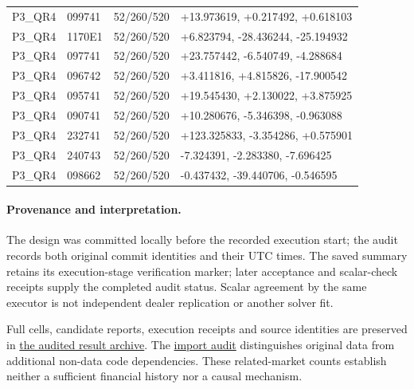 \begin{longtable}{lllp{7.5cm}}
P3\_QR4 & 099741 & 52/260/520 & +13.973619, +0.217492, +0.618103\\

P3\_QR4 & 1170E1 & 52/260/520 & +6.823794, -28.436244, -25.194932\\

P3\_QR4 & 097741 & 52/260/520 & +23.757442, -6.540749, -4.288684\\

P3\_QR4 & 096742 & 52/260/520 & +3.411816, +4.815826, -17.900542\\

P3\_QR4 & 095741 & 52/260/520 & +19.545430, +2.130022, +3.875925\\

P3\_QR4 & 090741 & 52/260/520 & +10.280676, -5.346398, -0.963088\\

P3\_QR4 & 232741 & 52/260/520 & +123.325833, -3.354286, +0.575901\\

P3\_QR4 & 240743 & 52/260/520 & -7.324391, -2.283380, -7.696425\\

P3\_QR4 & 098662 & 52/260/520 & -0.437432, -39.440706, -0.546595\\

\bottomrule\end{longtable}

\paragraph{Provenance and interpretation.} The design was committed locally before the recorded execution start; the audit records both original commit identities and their UTC times. The saved summary retains its execution-stage verification marker; later acceptance and scalar-check receipts supply the completed audit status. Scalar agreement by the same executor is not independent dealer replication or another solver fit.

Full cells, candidate reports, execution receipts and source identities are preserved in \href{https://github.com/ByronLi0207/financial-mathematics-paper-20261020/tree/submission-final/evidence/submission/final-jof/results/final-merge/wp2-cftc-mechanism}{the audited result archive}. The \href{https://github.com/ByronLi0207/financial-mathematics-paper-20261020/blob/submission-final/notes/submission/import-audit.md}{import audit} distinguishes original data from additional non-data code dependencies. These related-market counts establish neither a sufficient financial history nor a causal mechanism.
